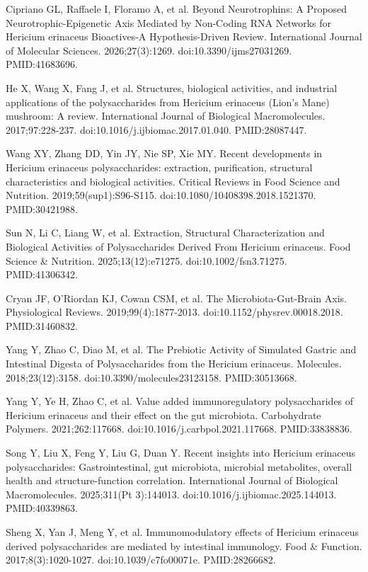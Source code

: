 \documentclass[12pt,oneside]{book}
\newcommand{\reff}[2]{\par\hangindent=7mm\hangafter=1\noindent[#1]\hspace{2mm}#2\par}
\begin{document}
\reff{12}{Cipriano GL, Raffaele I, Floramo A, et al. Beyond Neurotrophins: A Proposed Neurotrophic-Epigenetic Axis Mediated by Non-Coding RNA Networks for Hericium erinaceus Bioactives-A Hypothesis-Driven Review. International Journal of Molecular Sciences. 2026;27(3):1269. doi:10.3390/ijms27031269. PMID:41683696.}

\reff{13}{He X, Wang X, Fang J, et al. Structures, biological activities, and industrial applications of the polysaccharides from Hericium erinaceus (Lion's Mane) mushroom: A review. International Journal of Biological Macromolecules. 2017;97:228-237. doi:10.1016/j.ijbiomac.2017.01.040. PMID:28087447.}

\reff{14}{Wang XY, Zhang DD, Yin JY, Nie SP, Xie MY. Recent developments in Hericium erinaceus polysaccharides: extraction, purification, structural characteristics and biological activities. Critical Reviews in Food Science and Nutrition. 2019;59(sup1):S96-S115. doi:10.1080/10408398.2018.1521370. PMID:30421988.}

\reff{15}{Sun N, Li C, Liang W, et al. Extraction, Structural Characterization and Biological Activities of Polysaccharides Derived From Hericium erinaceus. Food Science \& Nutrition. 2025;13(12):e71275. doi:10.1002/fsn3.71275. PMID:41306342.}

\reff{16}{Cryan JF, O'Riordan KJ, Cowan CSM, et al. The Microbiota-Gut-Brain Axis. Physiological Reviews. 2019;99(4):1877-2013. doi:10.1152/physrev.00018.2018. PMID:31460832.}

\reff{17}{Yang Y, Zhao C, Diao M, et al. The Prebiotic Activity of Simulated Gastric and Intestinal Digesta of Polysaccharides from the Hericium erinaceus. Molecules. 2018;23(12):3158. doi:10.3390/molecules23123158. PMID:30513668.}

\reff{18}{Yang Y, Ye H, Zhao C, et al. Value added immunoregulatory polysaccharides of Hericium erinaceus and their effect on the gut microbiota. Carbohydrate Polymers. 2021;262:117668. doi:10.1016/j.carbpol.2021.117668. PMID:33838836.}

\reff{19}{Song Y, Liu X, Feng Y, Liu G, Duan Y. Recent insights into Hericium erinaceus polysaccharides: Gastrointestinal, gut microbiota, microbial metabolites, overall health and structure-function correlation. International Journal of Biological Macromolecules. 2025;311(Pt 3):144013. doi:10.1016/j.ijbiomac.2025.144013. PMID:40339863.}

\reff{20}{Sheng X, Yan J, Meng Y, et al. Immunomodulatory effects of Hericium erinaceus derived polysaccharides are mediated by intestinal immunology. Food \& Function. 2017;8(3):1020-1027. doi:10.1039/c7fo00071e. PMID:28266682.}
\end{document}
